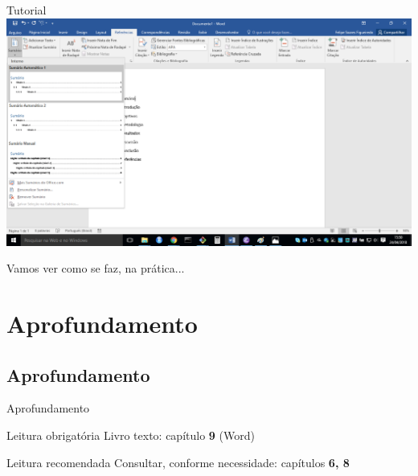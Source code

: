 \documentclass{beamer}
\begin{document}
\begin{frame}{Tutorial}
  \includegraphics[height=0.9\textheight]{EstruturaII/sumario2}
\end{frame}

\begin{frame}{}
  \begin{block}{}
    \Large
    Vamos ver como se faz, na prática...
  \end{block}
\end{frame}

\section{Aprofundamento}

\subsection{Aprofundamento}

\begin{frame}{Aprofundamento}
  \begin{block}{Leitura obrigatória}
    Livro texto: capítulo {\bf 9} (Word)
  \end{block}
  \begin{block}{Leitura recomendada}
    \footnotesize
    Consultar, conforme necessidade: capítulos {\bf 6, 8}
  \end{block}
\end{frame}


\end{document}
